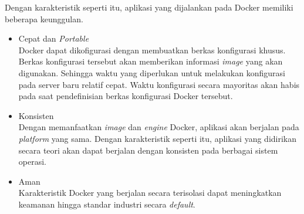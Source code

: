     Dengan karakteristik seperti itu, aplikasi yang dijalankan pada Docker
    memiliki beberapa keunggulan.
    \begin{itemize}
        \item Cepat dan \textit{Portable} \\
            Docker dapat dikofigurasi dengan membuatkan berkas konfigurasi
            khusus. Berkas konfigurasi tersebut akan memberikan informasi
            \textit{image} yang akan digunakan. Sehingga waktu yang diperlukan
            untuk melakukan konfigurasi pada server baru relatif cepat. Waktu
            konfigurasi secara mayoritas akan habis pada saat pendefinisian
            berkas konfigurasi Docker tersebut.
            
        \item Konsisten \\
            Dengan memanfaatkan \textit{image} dan \textit{engine} Docker,
            aplikasi akan berjalan pada \textit{platform} yang sama. Dengan
            karakteristik seperti itu, aplikasi yang didirikan secara teori akan
            dapat berjalan dengan konsisten pada berbagai sistem operasi.
            
        \item Aman \\
            Karakteristik Docker yang berjalan secara terisolasi dapat
            meningkatkan keamanan hingga standar
            industri\cite{docker:what-is-container} secara \textit{default}.
    \end{itemize}
    
